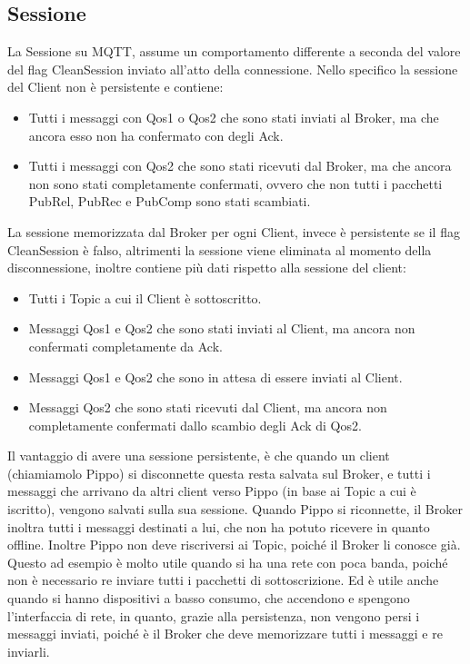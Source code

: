 \documentclass{article}
\begin{document}
\subsection{Sessione}
La Sessione su MQTT, assume un comportamento differente a seconda del valore del flag CleanSession inviato all'atto della connessione. Nello specifico la sessione del Client non è persistente e contiene:
\begin{itemize}
	\item Tutti i messaggi con Qos1 o Qos2 che sono stati inviati al Broker, ma che ancora esso non ha confermato con degli Ack.
	\item Tutti i messaggi con Qos2 che sono stati ricevuti dal Broker, ma che ancora non sono stati completamente confermati, ovvero che non tutti i pacchetti PubRel, PubRec e PubComp sono stati scambiati.
\end{itemize}
La sessione memorizzata dal Broker per ogni Client, invece è persistente se il flag CleanSession è falso, altrimenti la sessione viene eliminata al momento della disconnessione, inoltre contiene più dati rispetto alla sessione del client:
\begin{itemize}
	\item Tutti i Topic a cui il Client è sottoscritto.
	\item Messaggi Qos1 e Qos2 che sono stati inviati al Client, ma ancora non confermati completamente da Ack.
	\item Messaggi Qos1 e Qos2 che sono in attesa di essere inviati al Client.
	\item Messaggi Qos2 che sono stati ricevuti dal Client, ma ancora non completamente confermati dallo scambio degli Ack di Qos2.
\end{itemize}
Il vantaggio di avere una sessione persistente, è che quando un client (chiamiamolo Pippo) si disconnette questa resta salvata sul Broker, e tutti i messaggi che arrivano da altri client verso Pippo (in base ai Topic a cui è iscritto), vengono salvati sulla sua sessione. Quando Pippo si riconnette, il Broker inoltra tutti i messaggi destinati a lui, che non ha potuto ricevere in quanto offline. Inoltre Pippo non deve riscriversi ai Topic, poiché il Broker li conosce già. Questo ad esempio è molto utile quando si ha una rete con poca banda, poiché non è necessario re inviare tutti i pacchetti di sottoscrizione. Ed è utile anche quando si hanno dispositivi a basso consumo, che accendono e spengono l'interfaccia di rete, in quanto, grazie alla persistenza, non vengono persi i messaggi inviati, poiché è il Broker che deve memorizzare tutti i messaggi e re inviarli.
\end{document}
